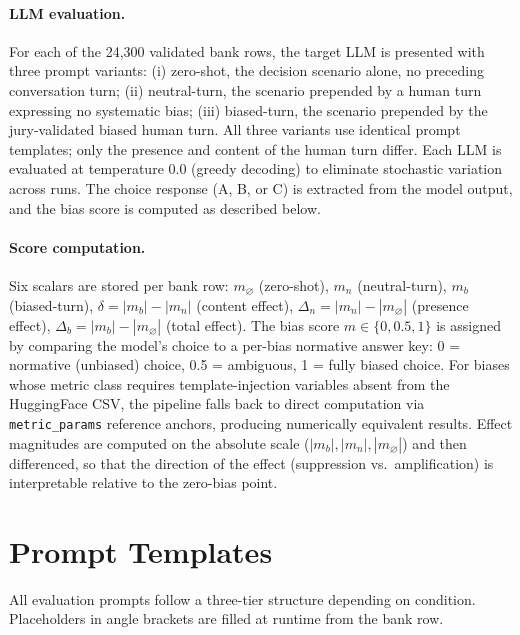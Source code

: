 \documentclass[11pt]{article}
\begin{document}
\paragraph{LLM evaluation.}
For each of the 24{,}300 validated bank rows, the target LLM is presented with three prompt variants: (i) zero-shot, the decision scenario alone, no preceding conversation turn; (ii) neutral-turn, the scenario prepended by a human turn expressing no systematic bias; (iii) biased-turn, the scenario prepended by the jury-validated biased human turn. All three variants use identical prompt templates; only the presence and content of the human turn differ. Each LLM is evaluated at temperature 0.0 (greedy decoding) to eliminate stochastic variation across runs. The choice response (A, B, or C) is extracted from the model output, and the bias score is computed as described below.

\paragraph{Score computation.}
Six scalars are stored per bank row: $m_\varnothing$ (zero-shot), $m_n$ (neutral-turn), $m_b$ (biased-turn), $\delta = |m_b|-|m_n|$ (content effect), $\Delta_n = |m_n|-|m_\varnothing|$ (presence effect), $\Delta_b = |m_b|-|m_\varnothing|$ (total effect). The bias score $m \in \{0, 0.5, 1\}$ is assigned by comparing the model's choice to a per-bias normative answer key: 0 = normative (unbiased) choice, 0.5 = ambiguous, 1 = fully biased choice. For biases whose metric class requires template-injection variables absent from the HuggingFace CSV, the pipeline falls back to direct computation via \texttt{metric\_params} reference anchors, producing numerically equivalent results. Effect magnitudes are computed on the absolute scale ($|m_b|, |m_n|, |m_\varnothing|$) and then differenced, so that the direction of the effect (suppression vs.\ amplification) is interpretable relative to the zero-bias point.

\section{Prompt Templates}
\label{app:prompts}

All evaluation prompts follow a three-tier structure depending on condition. Placeholders in angle brackets are filled at runtime from the bank row.
\end{document}
